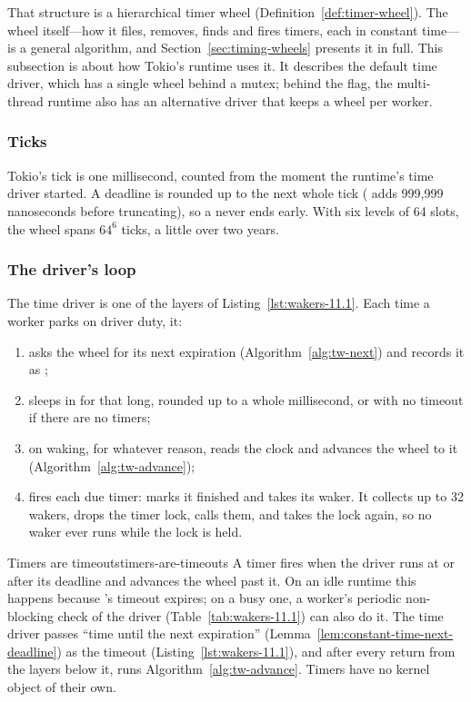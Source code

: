 That structure is a hierarchical timer wheel (Definition~\ref{def:timer-wheel}). The wheel itself---how it files, removes, finds and fires timers, each in constant time---is a general algorithm, and Section~\ref{sec:timing-wheels} presents it in full. This subsection is about how Tokio's runtime uses it. It describes the default time driver, which has a single wheel behind a mutex; behind the  flag, the multi-thread runtime also has an alternative driver that keeps a wheel per worker.

\subsubsection{Ticks}

Tokio's tick is one millisecond, counted from the moment the runtime's time driver started. A deadline is rounded up to the next whole tick ( adds 999,999 nanoseconds before truncating), so a  never ends early. With six levels of 64 slots, the wheel spans $64^6$ ticks, a little over two years.

\subsubsection{The driver's loop}

The time driver is one of the layers of Listing~\ref{lst:wakers-11.1}. Each time a worker parks on driver duty, it:

\begin{enumerate}
    \item asks the wheel for its next expiration (Algorithm~\ref{alg:tw-next}) and records it as ;
    \item sleeps in  for that long, rounded up to a whole millisecond, or with no timeout if there are no timers;
    \item on waking, for whatever reason, reads the clock and advances the wheel to it (Algorithm~\ref{alg:tw-advance});
    \item fires each due timer: marks it finished and takes its waker. It collects up to 32 wakers, drops the timer lock, calls them, and takes the lock again, so no waker ever runs while the lock is held.
\end{enumerate}

\begin{lemma}{Timers are timeouts}{timers-are-timeouts}
    A timer fires when the driver runs at or after its deadline and advances the wheel past it. On an idle runtime this happens because 's timeout expires; on a busy one, a worker's periodic non-blocking check of the driver (Table~\ref{tab:wakers-11.1}) can also do it.
    \why The time driver passes ``time until the next expiration'' (Lemma~\ref{lem:constant-time-next-deadline}) as the timeout (Listing~\ref{lst:wakers-11.1}), and after every return from the layers below it, runs Algorithm~\ref{alg:tw-advance}. Timers have no kernel object of their own.
\end{lemma}

